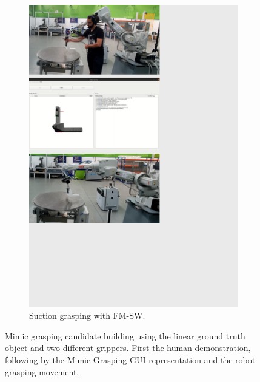 \begin{figure}[h!]
{\begin{tcolorbox}
\begin{subfigure}[c]{.495\textwidth}
         \includegraphics[trim={0cm 6cm 8cm 0cm},clip,width=1\linewidth,angle=0]{Cap5/Figuras/demo_01.pdf}
         \caption{Suction grasping with FM-SW.}
         \label{fig:demo_01}
     \end{subfigure}
    \end{tcolorbox}
    \caption{Mimic grasping candidate building using the linear ground truth object and two different grippers. First the human demonstration, following by the Mimic Grasping GUI representation and the robot grasping movement.}
    \label{fig:demos_mimic_grasping}
  }%
\end{figure}




